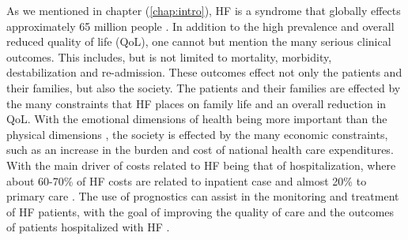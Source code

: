 \documentclass[../thesis.tex]{subfiles}
\begin{document}
\noindent As we mentioned in chapter (\ref{chap:intro}), HF is a syndrome that globally effects approximately 65 million people \citep{hay2017global}. In addition to the high prevalence and overall reduced quality of life (QoL), one cannot but mention the many serious clinical outcomes. This includes, but is not limited to mortality, morbidity, destabilization and re-admission. These outcomes effect not only the patients and their families, but also the society. The patients and their families are effected by the many constraints that HF places on family life and an overall reduction in QoL. With the emotional dimensions of health being more important than the physical dimensions \citep{dunderdale2005quality}, the society is effected by the many economic constraints, such as an increase in the burden and cost of national health care expenditures. With the main driver of costs related to HF being that of hospitalization, where about 60-70\% of HF costs are related to inpatient case and almost 20\% to primary care \citep{braunwald2015war}. The use of prognostics can assist in the monitoring and treatment of HF patients, with the goal of improving the quality of care and the outcomes of patients hospitalized with HF 
\citep{tripoliti2017heart}.\\
\end{document}

